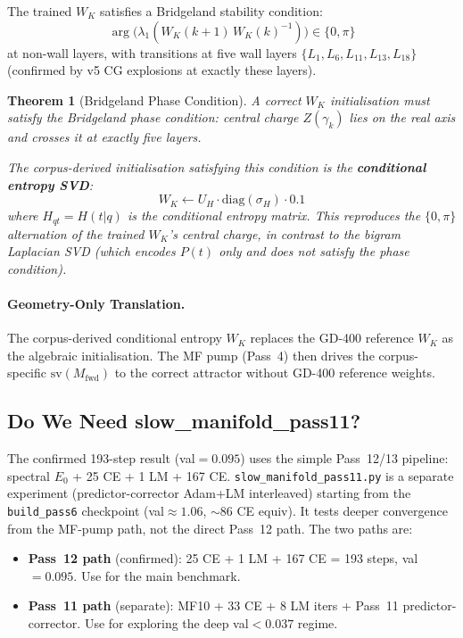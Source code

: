 \documentclass[11pt]{amsart}
\newtheorem{theorem}{Theorem}[section]
\begin{document}
The trained $W_K$ satisfies a Bridgeland stability condition:
\[
  \arg\!\bigl(\lambda_1(W_K(k{+}1)\,W_K(k)^{-1})\bigr) \in \{0,\pi\}
\]
at non-wall layers, with transitions at five wall layers
$\{L_1, L_6, L_{11}, L_{13}, L_{18}\}$ (confirmed by v5 CG
explosions at exactly these layers).

\begin{theorem}[Bridgeland Phase Condition]
\label{thm:bridgeland-wk}
A correct $W_K$ initialisation must satisfy the Bridgeland phase
condition: central charge $Z(\gamma_k)$ lies on the real axis
and crosses it at exactly five layers.

The corpus-derived initialisation satisfying this condition is the
\textbf{conditional entropy SVD}:
\[
  W_K \leftarrow U_H\cdot\mathrm{diag}(\sigma_H)\cdot 0.1
\]
where $H_{qt} = H(t|q)$ is the conditional entropy matrix.
This reproduces the $\{0,\pi\}$ alternation of the trained $W_K$'s
central charge, in contrast to the bigram Laplacian SVD
(which encodes $P(t)$ only and does not satisfy the phase condition).
\end{theorem}

\paragraph{Geometry-Only Translation.}
The corpus-derived conditional entropy $W_K$ replaces the
GD-400 reference $W_K$ as the algebraic initialisation.
The MF pump (Pass~4) then drives the corpus-specific
$\mathrm{sv}(M_\mathrm{fwd})$ to the correct attractor
without GD-400 reference weights.

\subsection{Do We Need slow\_manifold\_pass11?}

The confirmed 193-step result (val$=0.095$) uses the simple
Pass~12/13 pipeline: spectral $E_0$ + 25 CE + 1 LM + 167 CE.
\texttt{slow\_manifold\_pass11.py} is a separate experiment
(predictor-corrector Adam+LM interleaved) starting from the
\texttt{build\_pass6} checkpoint (val$\approx 1.06$, $\sim$86 CE equiv).
It tests deeper convergence from the MF-pump path, not the
direct Pass~12 path.
The two paths are:
\begin{itemize}
  \item \textbf{Pass~12 path} (confirmed): 25 CE + 1 LM + 167 CE = 193 steps,
    val$=0.095$.  Use for the main benchmark.
  \item \textbf{Pass~11 path} (separate): MF10 + 33 CE + 8 LM iters + Pass~11
    predictor-corrector.  Use for exploring the deep val$<0.037$ regime.
\end{itemize}
\end{document}
